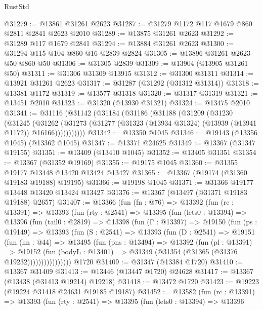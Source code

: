 \begin{lexlean}{RustStd}
\begin{coremodule}
@31279 := @13861 @31261 @2623
@31287 := @31279 @1172 @117 @1679 @860 @2811 @2841 @2623 @2010
@31289 := @13875 @31261 @2623
@31292 := @31289 @117 @1679 @2841
@31294 := @13884 @31261 @2623
@31300 := @31294 @115 @104 @860 @16 @2839 @2824
@31305 := @13896 @31261 @2623 @50 @860 @50
@31306 := @31305 @2839
@31309 := @13904 (@13905 @31261 @50)
@31311 := @31306 @31309 @13915
@31312 := @31300 @31311
@31314 := @13921 @31261 @2623
@31317 := @31287 (@31292 (@31312 @31314))
@31318 := @13381 @1172
@31319 := @13577 @31318
@31320 := @31317 @31319
@31321 := @13451 @2010
@31323 := @31320 (@13930 @31321)
@31324 := @13475 @2010
@31341 := @31116
    (@31142
      (@31184
        (@31186
          (@31188
            (@31209
              (@31230
                (@31245
                  (@31262
                    (@31273
                      (@31277 (@31323 (@13934 @31324) (@13939 (@13941 @1172)) @16166)))))))))))
@31342 := @13350 @1045
@31346 := @19143 (@13356 @1045) (@13362 @1045)
@31347 := @13371 @24625
@31349 := @13367 (@31347 @19155)
@31351 := @13409 (@13410 @1045)
@31352 := @13405 @31351
@31354 := @13367 (@31352 @19169)
@31355 := @19175 @1045
@31360 := @31355 @19177 @13448 @13420 @13424 @13427
@31365 := @13367 (@19174 (@31360 @19183 @19188) @19195)
@31366 := @19198 @1045
@31371 := @31366 @19177 @13448 @13420 @13424 @13427
@31376 := @13367 (@13497 (@31371 @19183 @19188) @2657)
@31407 := @13366
    (fun (fn : @76) =>
    @13392
      (fun (rc : @13391) =>
      @13393
        (fun (rty : @2541) =>
        @13395
          (fun (lets0 : @13394) =>
          @13396
            (fun (tail0 : @2819) =>
            @13398
              (fun (Γ : @13397) =>
              @19150
                (fun (ps : @19149) =>
                @13393
                  (fun (S : @2541) =>
                  @13393
                    (fun (D : @2541) =>
                    @19151
                      (fun (hn : @44) =>
                      @13495
                        (fun (pns : @13494) =>
                        @13392
                          (fun (pl : @13391) =>
                          @19152
                            (fun (bodyL : @13401) =>
                            @31349 (@31354 (@31365 (@31376 @19232))))))))))))))))
    @1720
@31409 := @31347 (@13384 @1720)
@31410 := @13367 @31409
@31413 := @13446 (@13447 @1720) @24628
@31417 := @13367 (@13438 (@31413 @19214) @19218)
@31418 := @13472 @1720
@31423 := @19223 (@19224 @31418 @24631 @19185 @19187)
@31452 := @13582
    (fun (rc : @13391) =>
    @13393
      (fun (rty : @2541) =>
      @13395
        (fun (lets0 : @13394) =>
        @13396

\end{coremodule}
\end{lexlean}
